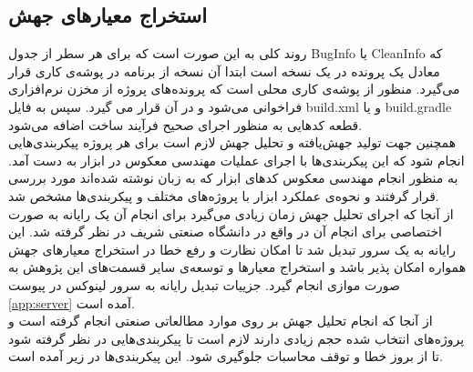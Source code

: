 \subsection{استخراج معیارهای جهش}
روند کلی به این صورت است که برای هر سطر از جدول BugInfo   یا CleanInfo که معادل یک  پرونده  در یک نسخه است ابتدا آن نسخه از برنامه در پوشه‌ی کاری قرار می‌گیرد. منظور از پوشه‌ی کاری محلی است  که پرونده‌های پروژه از مخزن نرم‌افزاری فراخوانی می‌شود و در آن قرار می گیرد. سپس به فایل build.xml    و یا build.gradle  قطعه کدهایی  به منظور  اجرای  صحیح فرآیند ساخت اضافه می‌شود.  \\
همچنین جهت تولید جهش‌یافته و تحلیل جهش لازم است برای هر پروژه پیکربندی‌هایی انجام شود که این پیکربندی‌ها با اجرای عملیات مهندسی معکوس در ابزار  به دست آمد. به منظور انجام مهندسی معکوس کدهای ابزار که به زبان  نوشته شده‌اند مورد بررسی قرار گرفتند و نحوه‌ی عملکرد ابزار با پروژه‌های مختلف و پیکربندی‌ها مشخص شد. \\
از آنجا که اجرای تحلیل جهش زمان زیادی می‌گیرد برای انجام آن یک رایانه به صورت اختصاصی برای انجام آن در  واقع در دانشگاه صنعتی شریف در نظر گرفته شد. این رایانه به یک سرور  تبدیل شد تا امکان نظارت و رفع خطا در استخراج معیارهای جهش همواره امکان پذیر باشد و استخراج معیارها و توسعه‌ی سایر قسمت‌های این پژوهش به صورت موازی انجام گیرد. جزییات تبدیل رایانه به سرور لینوکس در پیوست \ref{app:server} آمده است. \\
از آنجا که انجام تحلیل جهش بر روی موارد مطالعاتی صنعتی انجام گرفته است و پروژه‌های انتخاب شده حجم زیادی دارند لازم است تا پیکربندی‌هایی در نظر گرفته شود تا از بروز خطا و توقف محاسبات جلوگیری شود. این پیکربندی‌ها در زیر آمده است.  
